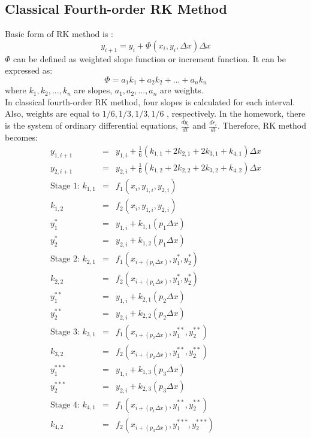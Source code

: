 \documentclass[letterpaper,12pt]{article}
\begin{document}
\subsection{Classical Fourth-order RK Method}
Basic form of RK method is :
\begin{equation}
	y_{i+1} = y_i + \Phi(x_i, y_i, \Delta x) \Delta x
	\label{eqn:rk}  
\end{equation} 
$\Phi$ can be defined as weighted slope function or increment function. It can be expressed as:
\begin{equation}
	\Phi = a_1k_1 + a_2k_2 + ... + a_nk_n
\end{equation}
where $k_1, k_2, ..., k_n$ are slopes, $a_1, a_2, ..., a_n$  are weights.\\
In classical fourth-order RK method, four slopes is calculated for each interval. Also, weights are equal to $1/6, 1/3, 1/3, 1/6$
, respectively. In the homework, there is the system of ordinary differential equations, $\frac{dy_i}{dt}$ and $\frac{dr_i}{dt}$. 
Therefore, RK method becomes:
\begin{eqnarray}
	y_{1,i+1}&=&y_{1,i} + \frac{1}{6}(k_{1,1} + 2k_{2,1} + 2k_{3,1} + k_{4,1})\Delta x \nonumber \\
	y_{2,i+1}&=&y_{2,i} + \frac{1}{6}(k_{1,2} + 2k_{2,2} + 2k_{3,2} + k_{4,2})\Delta x \nonumber \\
	\mbox{Stage 1: }k_{1,1}&=&f_1(x_i, y_{1,i}, y_{2,i} ) \nonumber \\
	k_{1,2}&=&f_2(x_i, y_{1,i}, y_{2,i}) \nonumber \\
	y^{*}_1 &=& y_{1,i} + k_{1,1}(p_1\Delta x) \nonumber \\
	y^{*}_2 &=& y_{2,i} + k_{1,2}(p_1\Delta x) \nonumber \\
	\mbox{Stage 2: }k_{2,1}&=&f_1(x_{i+(p_1\Delta x)} ,y^{*}_1, y^{*}_2 ) \nonumber \\
	k_{2,2}&=&f_2(x_{i+(p_1\Delta x)} ,y^{*}_1, y^{*}_2 ) \nonumber \\
	y^{**}_1&=&y_{1,i} + k_{2,1}(p_2\Delta x) \nonumber \\
	y^{**}_2&=&y_{2,i} + k_{2,2}(p_2\Delta x) \nonumber \\
	\mbox{Stage 3: }k_{3,1}&=&f_1(x_{i+(p_2\Delta x)} ,y^{**}_1, y^{**}_2 ) \nonumber \\
	k_{3,2}&=&f_2(x_{i+(p_2\Delta x)} ,y^{**}_1, y^{**}_2 ) \nonumber \\
	y^{***}_1&=&y_{1,i} + k_{1,3}(p_3\Delta x) \nonumber \\
	y^{***}_2&=&y_{2,i} + k_{2,3}(p_3\Delta x) \nonumber \\
	\mbox{Stage 4: }k_{4,1}&=&f_1(x_{i+(p_1\Delta x)} ,y^{**}_1, y^{**}_2 ) \nonumber \\
	k_{4,2}&=&f_2(x_{i+(p_3\Delta x)} ,y^{***}_1, y^{***}_2 ) \nonumber
\end{eqnarray}
\end{document}

